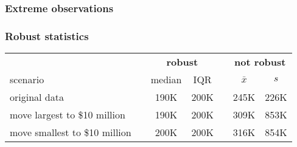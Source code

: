 \documentclass[slidestop,compress,mathserif]{beamer}
\begin{document}

\begin{frame}
\frametitle{Extreme observations}


\begin{center}
\end{center}

\end{frame}


\begin{frame}
\frametitle{Robust statistics}

\begin{center}
\end{center}

{\small
\begin{center}
\begin{tabular}{l c cc c cc}
  \hline
& \hspace{0mm} & \multicolumn{2}{c}{\bf robust} & \hspace{2mm} & \multicolumn{2}{c}{\bf not robust} \\
scenario && median & IQR && $\bar{x}$ & $s$ \\ 
  \hline
original data && 190K & 200K && 245K & 226K \\ 
move largest to \$10 million && 190K & 200K && 309K & 853K \\ 
move smallest to \$10 million && 200K & 200K && 316K & 854K \\ 
   \hline
\end{tabular}
\end{center}
}

\end{frame}

\end{document}
